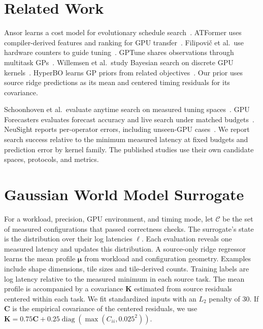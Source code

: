 \documentclass[conference]{IEEEtran}
\begin{document}
\section{Related Work}
Ansor learns a cost model for evolutionary schedule search~\cite{ansor}.
ATFormer uses compiler-derived features and ranking for GPU
transfer~\cite{atformer}. Filipovi\v{c} et al.\ use hardware counters to guide
tuning~\cite{filipovic}. GPTune shares observations through multitask
GPs~\cite{gptune}. Willemsen et al.\ study Bayesian search on discrete
GPU kernels~\cite{willemsen_bo}. HyperBO learns GP priors from related
objectives~\cite{hyperbo}. Our prior uses source ridge predictions as its
mean and centered timing residuals for its covariance.

Schoonhoven et al.\ evaluate anytime search on measured tuning
spaces~\cite{schoonhoven}. GPU Forecasters evaluates forecast accuracy
and live search under matched budgets~\cite{gpuforecasters}.
NeuSight reports per-operator errors, including unseen-GPU
cases~\cite{neusight}. We report search success relative to the minimum
measured latency at fixed budgets and prediction error by kernel family.
The published studies use their own candidate spaces, protocols, and metrics.

\section{Gaussian World Model Surrogate}
For a workload, precision, GPU environment, and timing mode, let
$\mathcal C$ be the set of measured configurations that passed correctness
checks. The surrogate's state is the distribution over their log latencies
$\boldsymbol{\ell}$. Each evaluation reveals one measured latency and
updates this distribution. A source-only ridge regressor
learns the mean profile $\boldsymbol{\mu}$ from workload and configuration
geometry. Examples include shape dimensions, tile sizes and tile-derived
counts. Training labels are log latency relative to the measured minimum in
each source task. The mean profile is accompanied by a covariance
$\mathbf K$ estimated from source residuals centered within each task.
We fit standardized inputs with an $L_2$ penalty of 30. If $\mathbf C$ is the
empirical covariance of the centered residuals, we use
$\mathbf K=0.75\mathbf C+0.25\operatorname{diag}(\max(C_{ii},0.025^2))$.
\end{document}
